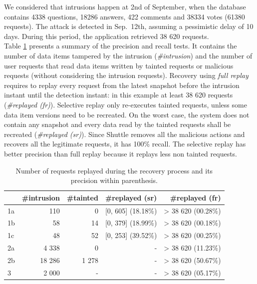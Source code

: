 We considered that intrusions happen at 2nd of September, when the database contains 4338 questions, 18286 answers, 422 comments and 38334 votes (61380 requests). The attack is detected in Sep.~12th, assuming a pessimistic delay of 10 days. During this period, the application retrieved 38 620 requests.\\

Table \ref{tab:accuracy} presents a summary of the precision and recall tests. It contains the number of data items tampered by the intrusion (\emph{\#intrusion}) and the number of user requests that read data items written by  tainted requests or malicious requests (without considering the intrusion requests). Recovery using \textit{full replay} requires to replay every request from the latest snapshot before the intrusion instant until the detection instant: in this example at least 38 620 requests (\emph{\#replayed (fr)}). Selective replay only re-executes tainted requests, unless some data item versions need to be recreated. On the worst case, the system does not contain any snapshot and every data read by the tainted requests shall be recreated (\emph{\#replayed (sr)}). Since Shuttle removes all the malicious actions and recovers all the legitimate requests, it has 100\% recall. The selective replay has better precision than full replay because it replays less non tainted requests.

\begin{table}
\centering
\begin{tabular}{l|rrrr}
    & \#intrusion & \#tainted & \#replayed (sr)               & \#replayed (fr)   \\ \hline
1a       & 110          & 0          & [0, 605] (18.18\%)   & > 38 620 (00.28\%)  \\
1b       & 58           & 14         & [0, 379] (18.99\%)   & > 38 620 (00.18\%)  \\
1c       & 48           & 52         & [0, 253] (39.52\%)   & > 38 620 (00.25\%)  \\
2a       & 4 338        & 0          &  -                   & > 38 620 (11.23\%)  \\
2b       & 18 286       & 1 278      &  -                   & > 38 620 (50.67\%)  \\
3        & 2 000        & -          &  -                   & > 38 620 (05.17\%)  \\
\end{tabular}
  \caption{Number of requests replayed during the recovery process and its precision within parenthesis.}
  \label{tab:accuracy}
  \vspace{-5mm}
\end{table}


